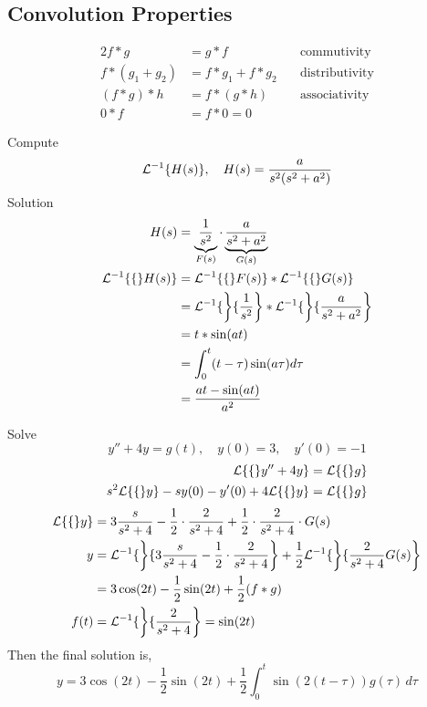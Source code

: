 \documentclass[diffeq.tex]{subfiles}
\begin{document}
    \subsection{Convolution Properties}
    \begin{alignat}{2}
        f * g &= g * f & \quad\text{commutivity}\\
        f * (g_{1} + g_{2}) &= f * g_{1} + f * g_{2} & \quad\text{distributivity}\\
        (f * g) * h &= f * (g * h) & \quad\text{associativity}\\
        0 * f &= f * 0 = 0&
    \end{alignat}
    \begin{example}
        Compute
        \begin{equation}
            \mathcal{L}^{-1}\{H(s)\},\quad H(s) = \frac{a}{s^{2}(s^{2} + a^{2})}
        \end{equation}
        Solution
        \begin{alignat}{1}
            H(s) &= \underbrace{\frac{1}{s^{2}}}_{F(s)} \cdot \underbrace{\frac{a}{s^{2} + a^{2}}}_{G(s)}\\
            \mathcal{L}^{-1}\{\{\}H(s)\} &= \mathcal{L}^{-1}\{\{\}F(s)\} * \mathcal{L}^{-1}\{\{\}G(s)\}\\
            &= \mathcal{L}^{-1}\{\left\}\{\frac{1}{s^{2}}\right\}*\mathcal{L}^{-1}\{\left\}\{\frac{a}{s^{2} + a^{2}}\right\}\\
            &= t * \sin(at)\\
            &= \int_{0}^{t}(t-\tau)\sin(a\tau)d\tau\\
            &= \frac{at-\sin(at)}{a^{2}}
        \end{alignat}
    \end{example}
    \begin{example}
        Solve
        \begin{equation}
            y'' + 4y = g(t),\quad y(0) = 3,\quad y'(0) = -1
        \end{equation}
        \begin{alignat}{1}
            \mathcal{L}\{\{\}y'' + 4y\} &= \mathcal{L}\{\{\}g\}\\
            s^{2}\mathcal{L}\{\{\}y\} - sy(0) - y'(0) + 4\mathcal{L}\{\{\}y\} &= \mathcal{L}\{\{\}g\}
        \end{alignat}
        \begin{alignat}{1}
            \mathcal{L}\{\{\}y\} &= 3\frac{s}{s^{2} + 4} - \frac{1}{2}\cdot\frac{2}{s^{2} + 4} + \frac{1}{2} \cdot \frac{2}{s^{2} + 4} \cdot G(s)\\
            y &= \mathcal{L}^{-1}\{\left\}\{3\frac{s}{s^{2} + 4} - \frac{1}{2}\cdot\frac{2}{s^{2} + 4}\right\} + \frac{1}{2}\mathcal{L}^{-1}\{\left\}\{\frac{2}{s^{2} + 4}G(s)\right\}\\
            &= 3\cos(2t)-\frac{1}{2}\sin(2t)+\frac{1}{2}(f * g)\\
            f(t) &= \mathcal{L}^{-1}\{\left\}\{\frac{2}{s^{2} + 4}\right\} = \sin(2t)
        \end{alignat}
        Then the final solution is,
        \begin{equation}
            y = 3\cos(2t) - \frac{1}{2}\sin(2t) + \frac{1}{2}\int_{0}^{t}\sin(2(t - \tau))g(\tau)\,d\tau
        \end{equation}
    \end{example}
\end{document}
